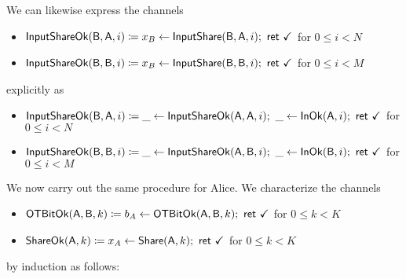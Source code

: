 \noindent We can likewise express the channels
\begin{itemize}
\item $\mathsf{InputShareOk}(\mathsf{B},\mathsf{A},i) \coloneqq x_B \leftarrow \mathsf{InputShare}(\mathsf{B},\mathsf{A},i); \ \mathsf{ret} \ \checkmark$ for $0 \leq i < N$
\item $\mathsf{InputShareOk}(\mathsf{B},\mathsf{B},i) \coloneqq x_B \leftarrow \mathsf{InputShare}(\mathsf{B},\mathsf{B},i); \ \mathsf{ret} \ \checkmark$ for $0 \leq i < M$
\end{itemize}
explicitly as
\begin{itemize}
\item $\InputShareOk(\B,\A,i) \coloneqq \_ \leftarrow \InputShareOk(\A,\A,i); \ \_ \leftarrow \InOk(\A,i); \ \ret{\checkmark}$ for $0 \leq i < N$
\item $\InputShareOk(\B,\B,i) \coloneqq \_ \leftarrow \InputShareOk(\A,\B,i); \ \_ \leftarrow \InOk(\B,i); \ \ret{\checkmark}$ for $0 \leq i < M$
\end{itemize}

\noindent We now carry out the same procedure for Alice. We characterize the channels
\begin{itemize}
\item $\mathsf{OTBitOk}(\mathsf{A},\mathsf{B},k) \coloneqq b_A \leftarrow \mathsf{OTBitOk}(\mathsf{A},\mathsf{B},k); \ \mathsf{ret} \ \checkmark$ for $0 \leq k < K$
\item $\mathsf{ShareOk}(\mathsf{A},k) \coloneqq x_A \leftarrow \mathsf{Share}(\mathsf{A},k); \ \mathsf{ret} \ \checkmark$ for $0 \leq k < K$
\end{itemize}
by induction as follows:

